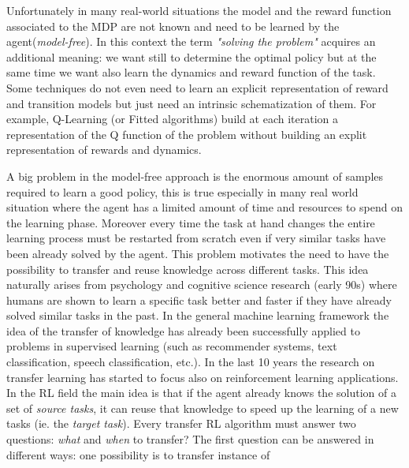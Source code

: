   \noindent Unfortunately in many real-world situations the model and the reward function
  associated to the MDP are not known and need to be learned by the agent(\textit{model-free}).
  In this context the term \textit{"solving the problem"} acquires an additional meaning:
  we want still to determine the optimal policy but at the same time we want also
  learn the dynamics and reward function of the task. Some techniques do not even
  need to learn an explicit representation of reward and transition models but
  just need an intrinsic schematization of them. For example, Q-Learning (or
  Fitted algorithms) build at each iteration a representation of the Q function
  of the problem without building an explit representation of rewards and dynamics.

  \noindent A big problem in the model-free approach is the enormous amount of
  samples required to learn a good policy, this is true especially in many real world situation where
  the agent has a limited amount of time and resources to spend on the learning phase. Moreover every time the
  task at hand changes the entire learning process must be restarted from scratch even
  if very similar tasks have been already solved by the agent.\newline
  This problem motivates the need to have the possibility to transfer and reuse knowledge across
  different tasks. This idea naturally arises from psychology and cognitive science research (early 90s) where
  humans are shown to learn a specific task better and faster if they have already solved similar tasks in the past.\newline
  In the general machine learning framework the idea of the transfer of knowledge has already been successfully
  applied to problems in supervised learning (such as recommender systems, text classification, speech classification, etc.).\newline
  In the last 10 years the research on transfer learning has started to focus also on reinforcement learning applications.\newline
  In the RL field the main idea is that if the agent already knows the solution of a set of \textit{source tasks}, it
  can reuse that knowledge to speed up the learning of a new tasks (ie. the \textit{target task}).\newline
  Every transfer RL algorithm must answer two questions: \textit{what} and \textit{when} to transfer?\newline
  The first question can be answered in different ways: one possibility is to transfer instance of
